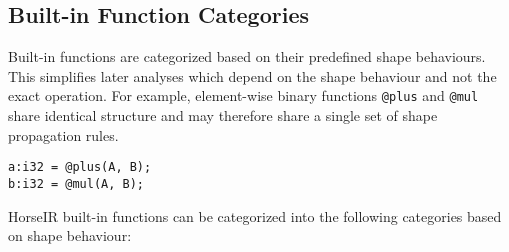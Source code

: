 

\subsection{Built-in Function Categories}\label{SubSec:groups}

Built-in functions are categorized based on their predefined shape behaviours.
This simplifies later analyses which depend on the shape behaviour and not
the exact operation. For example, element-wise binary functions \texttt{@plus}
and \texttt{@mul} share identical structure and may therefore share a single
set of shape propagation rules.
\begin{small}
\begin{Verbatim}[xleftmargin=.3\columnwidth]
a:i32 = @plus(A, B);
b:i32 = @mul(A, B);
\end{Verbatim}
\end{small}
HorseIR built-in functions can be categorized into the following categories based
on shape behaviour:

